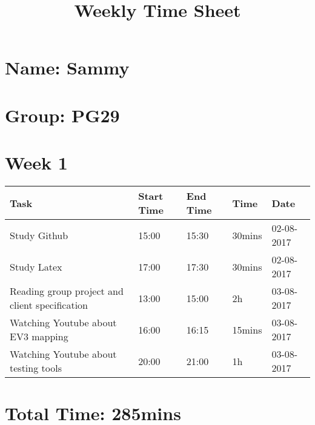 \documentclass[14]{article}
\title{Weekly Time Sheet}
\begin{document}
\maketitle

\section*{Name: Sammy}
\vspace*{10pt}
\section*{Group: PG29}
\vspace*{10pt}
\section*{Week 1}
\vspace*{10pt}

\begin{tabular}{|l|l|l|l|l|}\hline
Task & Start Time & End Time & Time & Date \\ \hline
Study Github & 15:00 & 15:30 & 30mins & 02-08-2017 \\ \hline
Study Latex & 17:00 & 17:30 & 30mins & 02-08-2017 \\ \hline
Reading group project and client specification & 13:00 & 15:00 & 2h & 03-08-2017 \\ \hline
Watching Youtube about EV3 mapping & 16:00 & 16:15 & 15mins & 03-08-2017 \\ \hline
Watching Youtube about testing tools & 20:00 & 21:00 & 1h & 03-08-2017 \\ \hline
\end{tabular}

\vspace*{10pt}
\section*{Total Time: 285mins}
\end{document}
